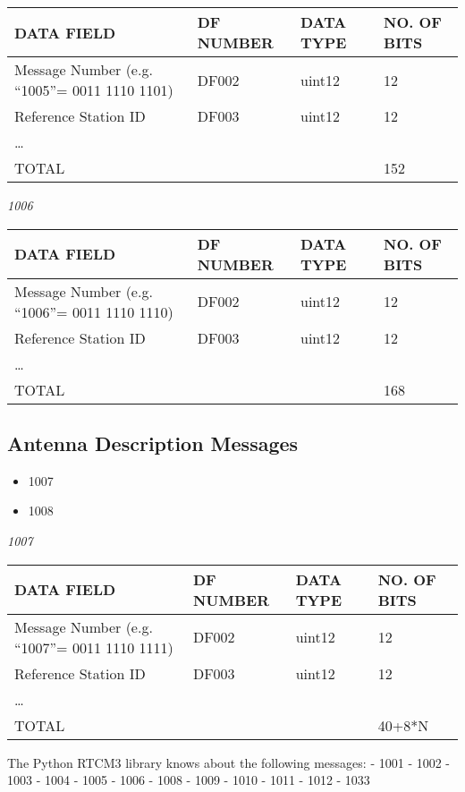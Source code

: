\begin{longtable}[]{@{}llll@{}}
\toprule
DATA FIELD & DF NUMBER & DATA TYPE & NO. OF BITS\tabularnewline
\midrule
\endhead
Message Number (e.g. ``1005''= 0011 1110 1101) & DF002 & uint12 &
12\tabularnewline
Reference Station ID & DF003 & uint12 & 12\tabularnewline
\ldots{} & & &\tabularnewline
TOTAL & & & 152\tabularnewline
\bottomrule
\end{longtable}

\hypertarget{section-1}{{\emph{1006}}\label{section-1}}

\begin{longtable}[]{@{}llll@{}}
\toprule
DATA FIELD & DF NUMBER & DATA TYPE & NO. OF BITS\tabularnewline
\midrule
\endhead
Message Number (e.g. ``1006''= 0011 1110 1110) & DF002 & uint12 &
12\tabularnewline
Reference Station ID & DF003 & uint12 & 12\tabularnewline
\ldots{} & & &\tabularnewline
TOTAL & & & 168\tabularnewline
\bottomrule
\end{longtable}

\subsection{Antenna Description
Messages}\label{antenna-description-messages}

\begin{itemize}
\item
  1007
\item
  1008
\end{itemize}

{\emph{1007}}\label{section-2}

\begin{longtable}[]{@{}llll@{}}
\toprule
DATA FIELD & DF NUMBER & DATA TYPE & NO. OF BITS\tabularnewline
\midrule
\endhead
Message Number (e.g. ``1007''= 0011 1110 1111) & DF002 & uint12 &
12\tabularnewline
Reference Station ID & DF003 & uint12 & 12\tabularnewline
\ldots{} & & &\tabularnewline
TOTAL & & & 40+8*N\tabularnewline
\bottomrule
\end{longtable}

The Python RTCM3 library knows about the following messages: - 1001 -
1002 - 1003 - 1004 - 1005 - 1006 - 1008 - 1009 - 1010 - 1011 - 1012 -
1033

